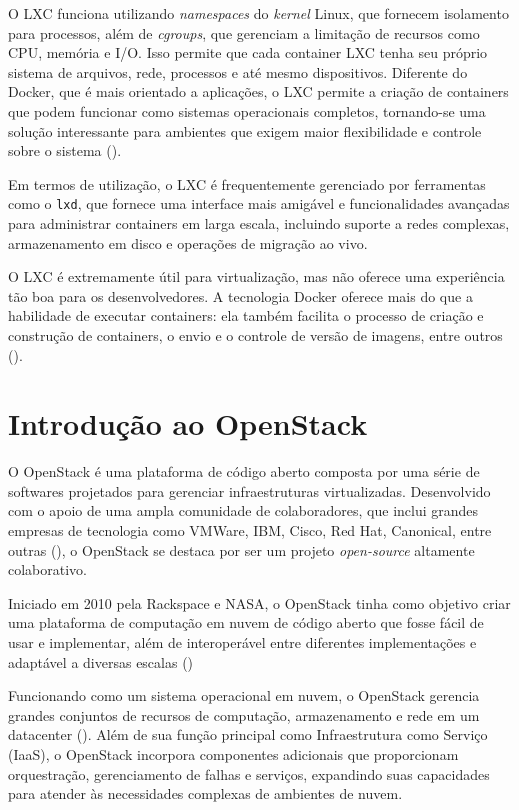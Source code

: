 O LXC funciona utilizando \textit{namespaces} do \textit{kernel} Linux, que fornecem isolamento para processos, além de \textit{cgroups}, que gerenciam a limitação de recursos como CPU, memória e I/O. Isso permite que cada container LXC tenha seu próprio sistema de arquivos, rede, processos e até mesmo dispositivos. Diferente do Docker, que é mais orientado a aplicações, o LXC permite a criação de containers que podem funcionar como sistemas operacionais completos, tornando-se uma solução interessante para ambientes que exigem maior flexibilidade e controle sobre o sistema (\cite{LinuxContainers}).

Em termos de utilização, o LXC é frequentemente gerenciado por ferramentas como o \texttt{lxd}, que fornece uma interface mais amigável e funcionalidades avançadas para administrar containers em larga escala, incluindo suporte a redes complexas, armazenamento em disco e operações de migração ao vivo.

O LXC é extremamente útil para virtualização, mas não oferece uma experiência tão boa para os desenvolvedores. A tecnologia Docker oferece mais do que a habilidade de executar containers: ela também facilita o processo de criação e construção de containers, o envio e o controle de versão de imagens, entre outros (\cite{WhatIsDocker}).


\section{Introdução ao OpenStack}

O OpenStack é uma plataforma de código aberto composta por uma série de softwares projetados para gerenciar infraestruturas virtualizadas. Desenvolvido com o apoio de uma ampla comunidade de colaboradores, que inclui grandes empresas de tecnologia como VMWare, IBM, Cisco, Red Hat, Canonical, entre outras (\cite{OpenStackIndtroductionUFRJ}), o OpenStack se destaca por ser um projeto \textit{open-source} altamente colaborativo.

Iniciado em 2010 pela Rackspace e NASA, o OpenStack tinha como objetivo criar uma plataforma de computação em nuvem de código aberto que fosse fácil de usar e implementar, além de interoperável entre diferentes implementações e adaptável a diversas escalas (\cite{DocumentacaoOpenstack})

Funcionando como um sistema operacional em nuvem, o OpenStack gerencia grandes conjuntos de recursos de computação, armazenamento e rede em um datacenter (\cite{OpenStackSoftware}). Além de sua função principal como Infraestrutura como Serviço (IaaS), o OpenStack incorpora componentes adicionais que proporcionam orquestração, gerenciamento de falhas e serviços, expandindo suas capacidades para atender às necessidades complexas de ambientes de nuvem.

